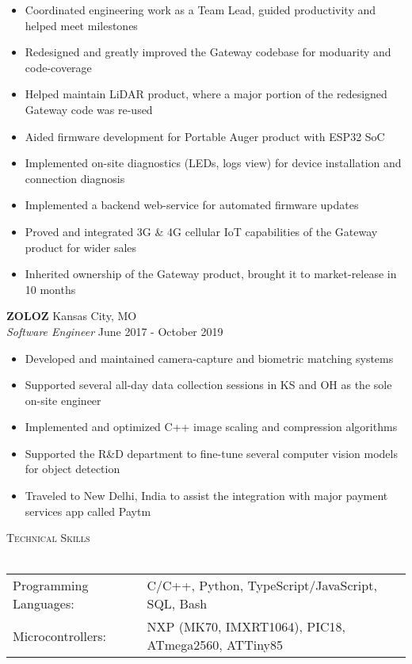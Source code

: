 \documentclass[a4paper]{article}
\newcommand{\lineunder} {
    \vspace*{-8pt} \\
    \hspace*{-18pt} \hrulefill \\
}
\newcommand{\header} [1] {
    {\hspace*{-18pt}\vspace*{6pt} \textsc{#1}}
    \vspace*{-6pt} \lineunder
}
\begin{document}
\begin{itemize} \itemsep 1pt
	\item Coordinated engineering work as a Team Lead, guided productivity and helped meet milestones
	\item Redesigned and greatly improved the Gateway codebase for moduarity and code-coverage
	\item Helped maintain LiDAR product, where a major portion of the redesigned Gateway code was re-used
	\item Aided firmware development for Portable Auger product with ESP32 SoC
	\item Implemented on-site diagnostics (LEDs, logs view) for device installation and connection diagnosis
	\item Implemented a backend web-service for automated firmware updates
	\item Proved and integrated 3G \& 4G cellular IoT capabilities of the Gateway product for wider sales
	\item Inherited ownership of the Gateway product, brought it to market-release in 10 months
\end{itemize}
\textbf{ZOLOZ} \hfill Kansas City, MO\\
\textit{Software Engineer} \hfill June 2017 - October 2019\\
\vspace{-1mm}
\begin{itemize} \itemsep 1pt
	\item Developed and maintained camera-capture and biometric matching systems
	\item Supported several all-day data collection sessions in KS and OH as the sole on-site engineer
	\item Implemented and optimized C++ image scaling and compression algorithms
	\item Supported the R\&D department to fine-tune several computer vision models for object detection
	\item Traveled to New Delhi, India to assist the integration with major payment services app called Paytm
\end{itemize}

\header{Technical Skills}
\begin{tabular}{ l l }
	Programming Languages: & C/C++, Python, TypeScript/JavaScript, SQL, Bash                            \\
    Microcontrollers:      & NXP (MK70, IMXRT1064), PIC18, ATmega2560, ATTiny85        \\
\end{tabular}
\vspace{2mm}
\end{document}
